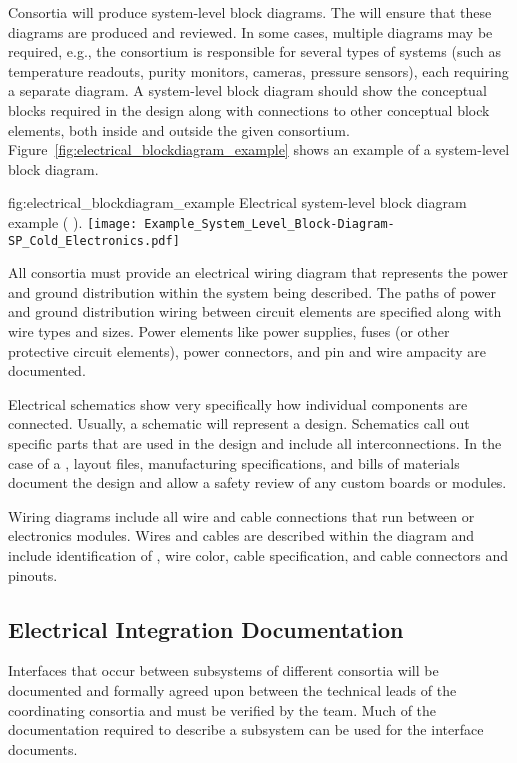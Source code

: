 Consortia will produce system-level block diagrams. The 
will ensure that these diagrams are produced and reviewed.  In some
cases, multiple diagrams may be required, e.g., the 
consortium is responsible for several types of systems (such as
temperature readouts, purity monitors, cameras, pressure sensors),
each requiring a separate diagram. A system-level block diagram should
show the conceptual blocks required in the design along with
connections to other conceptual block elements, both inside and
outside the given consortium.
Figure~\ref{fig:electrical_blockdiagram_example} shows an example of a
system-level block diagram.
\begin{dunefigure}{fig:electrical_blockdiagram_example}
  {Electrical system-level block diagram example ( ).}
 \texttt{[image: Example\_System\_Level\_Block-Diagram-SP\_Cold\_Electronics.pdf]}
\end{dunefigure}


All consortia must provide an electrical wiring diagram that 
represents the power and ground distribution within the system being
described.  The paths of power and ground distribution wiring between
circuit elements are specified along with wire types and sizes.  Power
elements like power supplies, fuses (or other protective circuit
elements), power connectors, and pin and wire ampacity are documented.


Electrical schematics show very specifically how individual
components are connected.  Usually, a schematic will represent a
 design.  Schematics call out specific
parts that are used in the design and include all interconnections.
In the case of a , layout files, manufacturing
specifications, and bills of materials document
the design and allow a safety review of any custom boards or
modules.


Wiring diagrams include all wire and cable connections that run
between  or electronics modules.  Wires and
cables are described within the diagram and include identification of
, wire color, cable specification, and
cable connectors and pinouts.


\subsection{Electrical Integration Documentation}
\label{sec:fdsp-coord-integ-electrical}

Interfaces that occur between subsystems of different consortia will
be documented and formally agreed upon between the technical leads of
the coordinating consortia and must be verified by the 
team.  Much of the documentation required to describe a subsystem can
be used for the interface documents.

